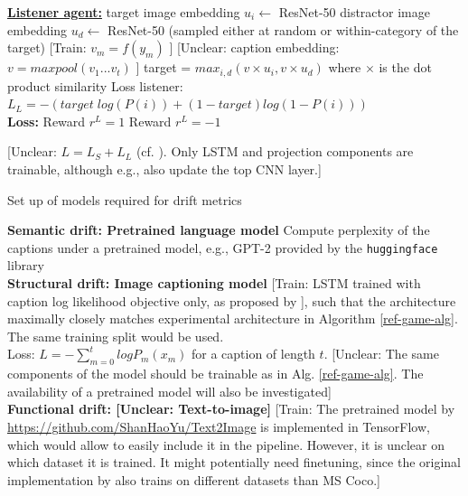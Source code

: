 \documentclass[11pt,letterpaper]{article}
\newcommand{\train}[1]{\textcolor{BurntOrange}{[Train: #1]}}
\newcommand{\unclear}[1]{\textcolor{Cerulean}{[Unclear: #1]}}
\begin{document}
\begin{enumerate}
\begin{algorithm}[h]
\begin{algorithmic}
			\State \underline{\textbf{Listener agent:}}
				\State target image embedding $u_i \gets $ ResNet-50 
				\State distractor image embedding $u_d \gets$ ResNet-50 (sampled either at random or within-category of the target)
					\State \train{$v_m = f(y_m)$  }
				\EndFor	
				\State \unclear{caption embedding: $v = maxpool(v_1...v_t)$ \cite{conneau-EtAl:2017:EMNLP2017}}
				\State target = $max_{i, d} (v \times u_i, v \times u_d)$ where $\times$ is the dot product similarity
				\State Loss listener: \\
				$L_L = -(target \; log(P(i)) + (1-target)log(1-P(i)))$ \\	

			\State \textbf{Loss:}
			\State Reward $r^L= 1$ 
			\Else
			\State Reward $r^L= -1$ 
			\EndIf	
			
			\unclear{$ L = L_S + L_L$ (cf. \cite{lee2019countering}).
			Only LSTM and projection components are trainable, although e.g., \cite{vinyals2015show} also update the top CNN layer.}

		\EndFor
		
	\end{algorithmic}
\end{algorithm}

\begin{algorithm}[h]
	\caption{Set up of models required for drift metrics}
	\label{alg:drift}
	\begin{algorithmic}
		\State \textbf{Semantic drift: Pretrained language model}
		\State Compute perplexity of the captions under a pretrained model, e.g., GPT-2 provided by the \texttt{huggingface} library \\
		\State \textbf{Structural drift: Image captioning model}
		\State \train{LSTM trained with caption log likelihood objective only, as proposed by \cite{vinyals2015show}}, such that the architecture maximally closely matches experimental architecture in Algorithm \ref{ref-game-alg}. The same training split would be used. \\
		Loss: $L = - \sum_{m=0}^{t}log P_m(x_m)$ for a caption of length $t$. \unclear{The same components of the model should be trainable as in Alg. \ref{ref-game-alg}. The availability of a pretrained model will also be investigated} \\
		\State \textbf{Functional drift: \unclear{Text-to-image}}
		\State \train{The pretrained model by \url{https://github.com/ShanHaoYu/Text2Image} is implemented in TensorFlow, which would allow to easily include it in the pipeline. However, it is unclear on which dataset it is trained. It might potentially need finetuning, since the original implementation by \cite{zhang2018stackgan++} also trains on different datasets than MS Coco.}
	\end{algorithmic}
\end{algorithm}

\end{enumerate}

 


\end{document}
